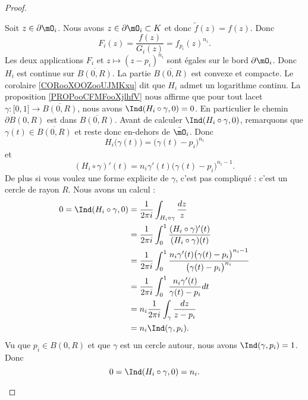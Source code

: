\begin{proof}
\begin{subproof}
		Soit \( z\in\partial\mO_i\). Nous avons \( z\in\partial\mO_i\subset K\) et donc \( \tilde f(z)=f(z)\). Donc
		\begin{equation}
			F_i(z)=\frac{ f(z) }{ G_i(z) }=f_{p_i}(z)^{n_i}.
		\end{equation}
		Les deux applications \( F_i\) et \( z\mapsto (z-p_i)^{n_i}\) sont égales sur le bord \( \partial\mO_i\). Donc \( H_i\) est continue sur \( \overline{ B(0,R) }\).
		La partie \( \overline{ B(0,R) }\) est convexe et compacte. Le corolaire \ref{CORooXOOZooUJMKxu} dit que \( H_i\) admet un logarithme continu. La proposition \ref{PROPooCFMFooXjlhfV} nous affirme que pour tout lacet \( \gamma\colon \mathopen[ 0 , 1 \mathclose]\to \overline{ B(0,R) }\), nous avons \( \Ind(H_i\circ \gamma,0)=0\). En particulier le chemin \( \partial B(0,R)\) est dans \( \overline{ B(0,R) }\). Avant de calculer \( \Ind(H_i\circ\gamma,0)\), remarquons que \( \gamma(t)\in\overline{ B(0,R) }\) et reste donc en-dehors de \( \bar\mO_i\). Donc
		\begin{equation}
			H_i\big( \gamma(t) \big)=\big( \gamma(t)-p_i \big)^{n_i}
		\end{equation}
		et
		\begin{equation}
			(H_i\circ\gamma)'(t)=n_i\gamma'(t)\big( \gamma(t)-p_i \big)^{n_i-1}.
		\end{equation}
		De plus si vous voulez une forme explicite de \( \gamma\), c'est pas compliqué : c'est un cercle de rayon \( R\). Nous avons un calcul :
		\begin{subequations}
			\begin{align}
				0= \Ind(H_i\circ\gamma,0) & =\frac{1}{ 2\pi i }\int_{H_i\circ\gamma}\frac{ dz }{ z }                                                               \\
				                          & =\frac{1}{ 2\pi i }\int_0^1\frac{ (H_i\circ\gamma)'(t) }{ (H_i\circ\gamma)(t) }                                        \\
				                          & =\frac{1}{ 2\pi i  }\int_0^1\frac{ n_i\gamma'(t)\big( \gamma(t)-p_i \big)^{n_i-1} }{ \big( \gamma(t)-p_i \big)^{n_i} } \\
				                          & =\frac{1}{ 2\pi i }\int_0^1\frac{ n_i\gamma'(t) }{ \gamma(t)-p_i }dt                                                   \\
				                          & =n_i\frac{1}{ 2\pi i }\int_{\gamma}\frac{ dz }{ z-p_i }                                                                \\
				                          & =n_i\Ind(\gamma,p_i).
			\end{align}
		\end{subequations}
		Vu que \( p_i\in B(0,R)\) et que \( \gamma\) est un cercle autour, nous avons \( \Ind(\gamma,p_i)=1\). Donc
		\begin{equation}
			0=\Ind(H_i\circ \gamma,0)=n_i.
		\end{equation}
	\end{subproof}
\end{proof}

